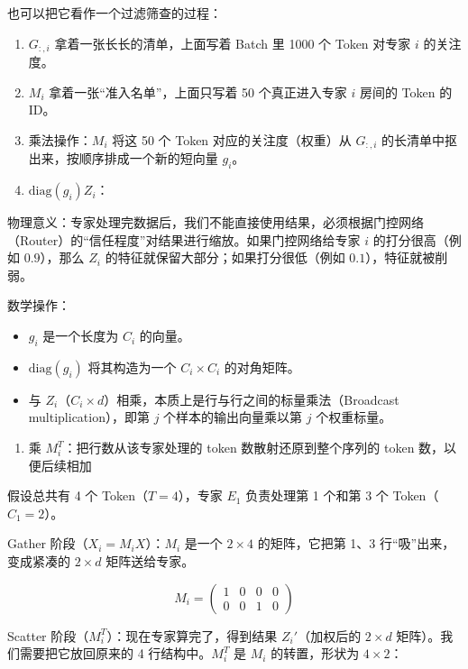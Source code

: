 也可以把它看作一个过滤筛查的过程：

\begin{enumerate}
\def\labelenumi{\arabic{enumi}.}
\item
  \(G_{:,i}\) 拿着一张长长的清单，上面写着 Batch 里 1000 个 Token 对专家 \(i\) 的关注度。
\item
  \(M_i\) 拿着一张``准入名单''，上面只写着 50 个真正进入专家 \(i\) 房间的 Token 的 ID。
\item
  乘法操作：\(M_i\) 将这 50 个 Token 对应的关注度（权重）从 \(G_{:,i}\) 的长清单中抠出来，按顺序排成一个新的短向量 \(g_i\)。
\item
  \(\mathrm{diag}(g_i)Z_i\)：
\end{enumerate}

物理意义：专家处理完数据后，我们不能直接使用结果，必须根据门控网络（Router）的``信任程度''对结果进行缩放。如果门控网络给专家 \(i\) 的打分很高（例如 \(0.9\)），那么 \(Z_i\) 的特征就保留大部分；如果打分很低（例如 \(0.1\)），特征就被削弱。

数学操作：

\begin{itemize}
\tightlist
\item
  \(g_i\) 是一个长度为 \(C_i\) 的向量。
\item
  \(\mathrm{diag}(g_i)\) 将其构造为一个 \(C_i \times C_i\) 的对角矩阵。
\item
  与 \(Z_i\)（\(C_i \times d\)）相乘，本质上是行与行之间的标量乘法（Broadcast multiplication），即第 \(j\) 个样本的输出向量乘以第 \(j\) 个权重标量。
\end{itemize}

\begin{enumerate}
\def\labelenumi{\arabic{enumi}.}
\setcounter{enumi}{2}
\tightlist
\item
  乘 \(M_i^T\)：把行数从该专家处理的 token 数散射还原到整个序列的 token 数，以便后续相加
\end{enumerate}

假设总共有 4 个 Token（\(T=4\)），专家 \(E_1\) 负责处理第 1 个和第 3 个 Token（\(C_1=2\)）。

Gather 阶段（\(X_i=M_iX\)）：\(M_i\) 是一个 \(2 \times 4\) 的矩阵，它把第 1、3 行``吸''出来，变成紧凑的 \(2 \times d\) 矩阵送给专家。

\[
M_i =
\begin{pmatrix}
1 & 0 & 0 & 0 \\
0 & 0 & 1 & 0
\end{pmatrix}
\]

Scatter 阶段（\(M_i^T\)）：现在专家算完了，得到结果 \(Z_i'\)（加权后的 \(2 \times d\) 矩阵）。我们需要把它放回原来的 4 行结构中。\(M_i^T\) 是 \(M_i\) 的转置，形状为 \(4 \times 2\)：

